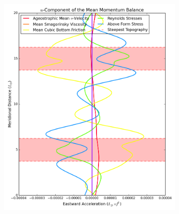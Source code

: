 \documentclass[12pt,a4paper]{report}
\begin{document}
\begin{figure}
\begin{subfigure}{0.48\linewidth}
 		\label{fig:umomlayer2}
 	\end{subfigure}
 	\begin{subfigure}{0.48\linewidth}
 		\centering
 		\caption{}
 		\includegraphics[width=\linewidth ]{umom_1}
 		\label{fig:umomlayer1}
 	\end{subfigure}
 	\quad
 	\begin{subfigure}{0.48\linewidth}
 		\centering
 		\caption{}

\end{subfigure}
\end{figure}
\end{document}
